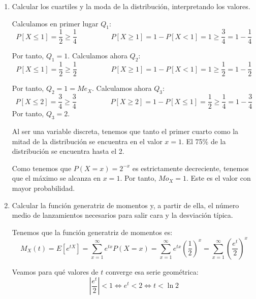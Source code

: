 \begin{ejercicio}
\begin{enumerate}
        \item Calcular los cuartiles y la moda de la distribución, interpretando los valores.

        Calculamos en primer lugar $Q_1$:
        \begin{equation*}
            P[X\leq 1] = \frac{1}{2} \geq \frac{1}{4}
            \hspace{2cm}
            P[X\geq 1] = 1-P[X<1] = 1 \geq \frac{3}{4} = 1-\frac{1}{4}
        \end{equation*}

        Por tanto, $Q_1 = 1$. Calculamos ahora $Q_2$:
        \begin{equation*}
            P[X\leq 1] = \frac{1}{2} \geq \frac{1}{2}
            \hspace{2cm}
            P[X\geq 1] = 1-P[X<1] = 1 \geq \frac{1}{2} = 1-\frac{1}{2}
        \end{equation*}

        Por tanto, $Q_2 = 1 =Me_X$. Calculamos ahora $Q_3$:
        \begin{equation*}
            P[X\leq 2] = \frac{3}{4} \geq \frac{3}{4}
            \hspace{2cm}
            P[X\geq 2] = 1-P[X\leq 1] = \frac{1}{2} \geq \frac{1}{4} = 1-\frac{3}{4}
        \end{equation*}
        Por tanto, $Q_3 = 2$.

        Al ser una variable discreta, tenemos que tanto el primer cuarto como la mitad de la distribución se encuentra en el valor $x=1$. El 75\% de la distribución se encuentra hasta el 2.

        Como tenemos que $P(X=x) = 2^{-x}$ es estrictamente decreciente, tenemos que el máximo se alcanza en $x=1$. Por tanto, $Mo_X = 1$. Este es el valor con mayor probabilidad.

        \item Calcular la función generatriz de momentos y, a partir de ella, el número medio de lanzamientos necesarios para salir cara y la desviación típica.

        Tenemos que la función generatriz de momentos es:
        \begin{equation*}
            M_X (t) = E[e^{tX}] = \sum_{x=1}^\infty e^{tx} P(X=x)
            = \sum_{x=1}^\infty e^{tx} \left(\frac{1}{2}\right)^x
            = \sum_{x=1}^\infty \left(\frac{e^t}{2}\right)^x
        \end{equation*}

        Veamos para qué valores de $t$ converge esa serie geométrica:
        \begin{equation*}
            \left|\frac{e^t}{2}\right|<1 \Longleftrightarrow e^t <2 \Longleftrightarrow t<\ln 2
        \end{equation*}


\end{enumerate}
\end{ejercicio}

